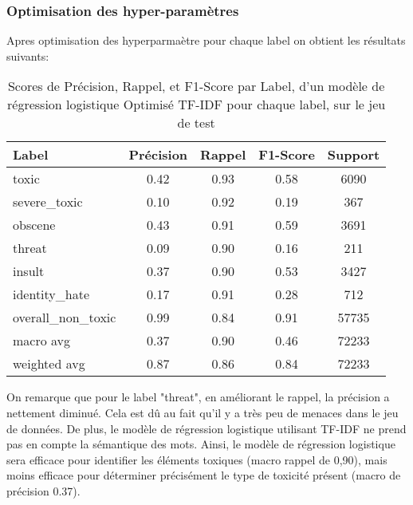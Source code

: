 \subsubsection{Optimisation des hyper-paramètres}
Apres optimisation des hyperparmaètre pour chaque label on obtient les résultats suivants:

\begin{table}[ht]
    \centering
    \caption{Scores de Précision, Rappel, et F1-Score par Label, d'un modèle de régression logistique Optimisé TF-IDF pour chaque label, sur le jeu de test}    \begin{tabular}{lcccc}
    \hline
    \textbf{Label} & \textbf{Précision} & \textbf{Rappel} & \textbf{F1-Score} & \textbf{Support} \\ \hline
    toxic          & 0.42               & 0.93            & 0.58              & 6090             \\
    severe\_toxic  & 0.10               & 0.92            & 0.19              & 367              \\
    obscene        & 0.43               & 0.91            & 0.59              & 3691             \\
    threat         & 0.09               & 0.90            & 0.16              & 211              \\
    insult         & 0.37               & 0.90            & 0.53              & 3427             \\
    identity\_hate & 0.17               & 0.91            & 0.28              & 712              \\
    overall\_non\_toxic & 0.99           & 0.84            & 0.91              & 57735            \\\hline
    macro avg      & 0.37               & 0.90            & 0.46              & 72233            \\
    weighted avg   & 0.87               & 0.86            & 0.84              & 72233            \\
    \end{tabular}
    \label{tab:scores}
\end{table}

On remarque que pour le label "threat", en améliorant le rappel, la précision a nettement diminué. 
Cela est dû au fait qu'il y a très peu de menaces dans le jeu de données. 
De plus, le modèle de régression logistique utilisant TF-IDF ne prend pas en compte la sémantique des mots. 
Ainsi, le modèle de régression logistique sera efficace pour identifier les éléments toxiques (macro rappel de 0,90), mais moins efficace pour déterminer précisément le type de toxicité présent (macro de précision 0.37).

